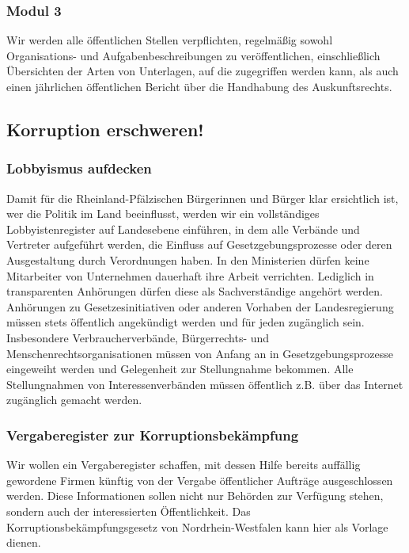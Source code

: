 \subsubsection{Modul 3}
\abstimmung
Wir werden alle öffentlichen Stellen verpflichten, regelmäßig sowohl Organisations- und Aufgabenbeschreibungen zu veröffentlichen, einschließlich Übersichten der Arten von Unterlagen, auf die zugegriffen werden kann, als auch einen jährlichen öffentlichen Bericht über die Handhabung des Auskunftsrechts.
 
\subsection*{Korruption erschweren!}
\subsubsection{Lobbyismus aufdecken}
\abstimmung
Damit für die Rheinland-Pfälzischen Bürgerinnen und Bürger klar ersichtlich ist, wer die Politik im Land beeinflusst, werden wir ein vollständiges Lobbyistenregister auf Landesebene einführen, in dem alle Verbände und Vertreter aufgeführt werden, die Einfluss auf Gesetzgebungsprozesse oder deren Ausgestaltung durch Verordnungen haben. In den Ministerien dürfen keine Mitarbeiter von Unternehmen dauerhaft ihre Arbeit verrichten. Lediglich in transparenten Anhörungen dürfen diese als Sachverständige angehört werden. Anhörungen zu Gesetzesinitiativen oder anderen Vorhaben der Landesregierung müssen stets öffentlich angekündigt werden und für jeden zugänglich sein. Insbesondere Verbraucherverbände, Bürgerrechts- und Menschenrechtsorganisationen müssen von Anfang an in Gesetzgebungsprozesse eingeweiht werden und Gelegenheit zur Stellungnahme bekommen. Alle Stellungnahmen von Interessenverbänden müssen öffentlich z.B. über das Internet zugänglich gemacht werden.

\subsubsection{Vergaberegister zur Korruptionsbekämpfung}
\abstimmung
Wir wollen ein Vergaberegister schaffen, mit dessen Hilfe bereits auffällig gewordene Firmen künftig von der Vergabe öffentlicher Aufträge ausgeschlossen werden. Diese Informationen sollen nicht nur Behörden zur Verfügung stehen, sondern auch der interessierten Öffentlichkeit. Das Korruptionsbekämpfungsgesetz von Nordrhein-Westfalen kann hier als Vorlage dienen.

